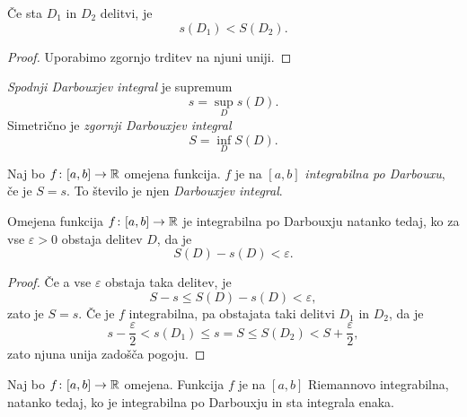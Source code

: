 \documentclass[12pt, a4paper]{article}
\begin{document}
\begin{posledica}
Če sta $D_1$ in $D_2$ delitvi, je
\[
s(D_1)<S(D_2).
\]
\end{posledica}

\begin{proof}
Uporabimo zgornjo trditev na njuni uniji.
\end{proof}

\begin{definicija}
\emph{Spodnji Darbouxjev integral} je supremum
\[
s=\sup_D s(D).
\]
Simetrično je \emph{zgornji Darbouxjev integral}
\[
S=\inf_D S(D).
\]
\end{definicija}

\begin{okvir}
\begin{definicija}
Naj bo $f\colon[a,b]\to\mathbb{R}$ omejena funkcija. $f$ je na $[a,b]$ \emph{integrabilna po Darbouxu}, če je $S=s$. To število je njen \emph{Darbouxjev integral}.
\end{definicija}
\end{okvir}

\begin{trditev}
Omejena funkcija $f\colon[a,b]\to\mathbb{R}$ je integrabilna po Darbouxju natanko tedaj, ko za vse $\varepsilon>0$ obstaja delitev $D$, da je
\[
S(D)-s(D)<\varepsilon.
\]
\end{trditev}

\begin{proof}
Če a vse $\varepsilon$ obstaja taka delitev, je
\[
S-s\leq S(D)-s(D)<\varepsilon,
\]
zato je $S=s$. Če je $f$ integrabilna, pa obstajata taki delitvi $D_1$ in $D_2$, da je
\[
s-\frac{\varepsilon}{2}<s(D_1)\leq s=S\leq S(D_2)<S+\frac{\varepsilon}{2},
\]
zato njuna unija zadošča pogoju.
\end{proof}

\begin{izrek}
Naj bo $f\colon[a,b]\to\mathbb{R}$ omejena. Funkcija $f$ je na $[a,b]$ Riemannovo integrabilna, natanko tedaj, ko je integrabilna po Darbouxju in sta integrala enaka.
\end{izrek}
\end{document}
